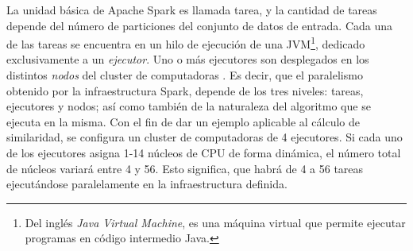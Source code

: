 \bigskip La unidad básica de Apache Spark es llamada tarea, y la cantidad de tareas depende del número de particiones del conjunto de datos de entrada. Cada una de las tareas se encuentra en un hilo de ejecución de una JVM\footnote{Del inglés \textit{Java Virtual Machine}, es una máquina virtual que permite ejecutar programas en código intermedio Java.}, dedicado exclusivamente a un \textit{ejecutor}. Uno o más ejecutores son desplegados en los distintos \textit{nodos} del cluster de computadoras \citep{janardhanan2020optimum}. Es decir, que el paralelismo obtenido por la infraestructura Spark, depende de los tres niveles: tareas, ejecutores y nodos; así como también de la naturaleza del algoritmo que se ejecuta en la misma. Con el fin de dar un ejemplo aplicable al cálculo de similaridad, se configura un cluster de computadoras de 4 ejecutores. Si cada uno de los ejecutores asigna 1-14 núcleos de CPU de forma dinámica, el número total de núcleos variará entre 4 y 56. Esto significa, que habrá de 4 a 56 tareas ejecutándose paralelamente en la infraestructura definida.
